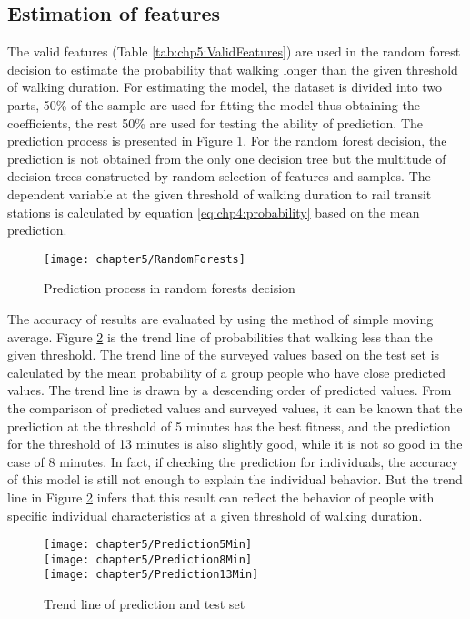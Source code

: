 %
\subsection{Estimation of features}
The valid features (Table \ref{tab:chp5:ValidFeatures}) are used in the random forest decision to estimate the probability that walking longer than the given threshold of walking duration. For estimating the model, the dataset is divided into two parts, 50\% of the sample are used for fitting the model thus obtaining the coefficients, the rest 50\% are used for testing the ability of prediction. The prediction process is presented in Figure \ref{fig:chp5:RandomForests}. For the random forest decision, the prediction is not obtained from the only one decision tree but the multitude of decision trees constructed by random selection of features and samples. The dependent variable at the given threshold of walking duration to rail transit stations is calculated by equation \ref{eq:chp4:probability} based on the mean prediction.

\begin{figure}[htbp]
	\centering
	\texttt{[image: chapter5/RandomForests]}
	\caption{Prediction process in random forests decision}
	\label{fig:chp5:RandomForests}
\end{figure}

%
The accuracy of results are evaluated by using the method of simple moving average. Figure \ref{fig:chp5:Prediction} is the trend line of probabilities that walking less than the given threshold. The trend line of the surveyed values based on the test set is calculated by the mean probability of a group people who have close predicted values. The trend line is drawn by a descending order of predicted values. From the comparison of predicted values and surveyed values, it can be known that the prediction at the threshold of 5 minutes has the best fitness, and the prediction for the threshold of 13 minutes is also slightly good, while it is not so good in the case of 8 minutes. In fact, if checking the prediction for individuals, the accuracy of this model is still not enough to explain the individual behavior. But the trend line in Figure \ref{fig:chp5:Prediction} infers that this result can reflect the behavior of people with specific individual characteristics at a given threshold of walking duration. 

\begin{figure}[htbp]
	\centering
	\texttt{[image: chapter5/Prediction5Min]} \\
	\texttt{[image: chapter5/Prediction8Min]} \\
	\texttt{[image: chapter5/Prediction13Min]} \\
	\caption{Trend line of prediction and test set}
	\label{fig:chp5:Prediction}
\end{figure}


